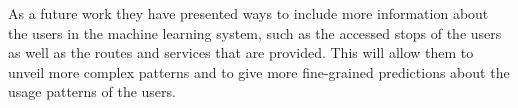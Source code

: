 As a future work they have presented ways to include more information about the users in the machine learning system, such as the accessed stops of the users as well as the routes and services that are provided. This will allow them to unveil more complex patterns and to give more fine-grained predictions about the usage patterns of the users.
